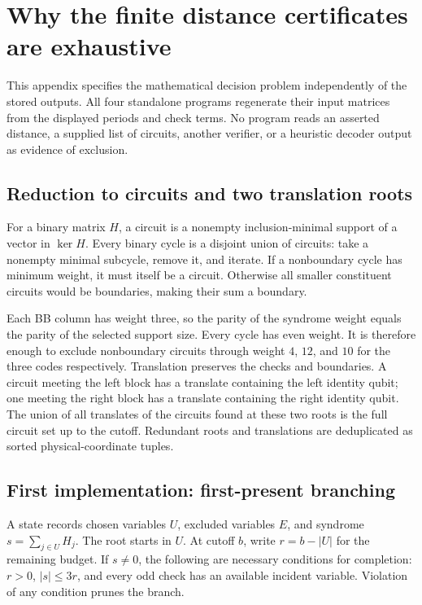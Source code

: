 \section{Why the finite distance certificates are exhaustive}
\label{app:algorithms}
This appendix specifies the mathematical decision problem independently of the stored outputs. All four standalone programs regenerate their input matrices from the displayed periods and check terms. No program reads an asserted distance, a supplied list of circuits, another verifier, or a heuristic decoder output as evidence of exclusion.

\subsection{Reduction to circuits and two translation roots}
For a binary matrix $H$, a circuit is a nonempty inclusion-minimal support of a vector in $\ker H$. Every binary cycle is a disjoint union of circuits: take a nonempty minimal subcycle, remove it, and iterate. If a nonboundary cycle has minimum weight, it must itself be a circuit. Otherwise all smaller constituent circuits would be boundaries, making their sum a boundary.

Each BB column has weight three, so the parity of the syndrome weight equals the parity of the selected support size. Every cycle has even weight. It is therefore enough to exclude nonboundary circuits through weight $4$, $12$, and $10$ for the three codes respectively. Translation preserves the checks and boundaries. A circuit meeting the left block has a translate containing the left identity qubit; one meeting the right block has a translate containing the right identity qubit. The union of all translates of the circuits found at these two roots is the full circuit set up to the cutoff. Redundant roots and translations are deduplicated as sorted physical-coordinate tuples.

\subsection{First implementation: first-present branching}
A state records chosen variables $U$, excluded variables $E$, and syndrome $s=\sum_{j\in U}H_j$. The root starts in $U$. At cutoff $b$, write $r=b-|U|$ for the remaining budget. If $s\ne0$, the following are necessary conditions for completion: $r>0$, $|s|\le3r$, and every odd check has an available incident variable. Violation of any condition prunes the branch.

